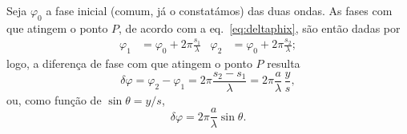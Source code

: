 Seja $\varphi_0$ a fase inicial (comum, já o constatámos) das duas ondas. As
fases com que atingem o ponto $P$, de acordo com a eq.~\eqref{eq:deltaphix}, são
então dadas por 
\begin{align*}
\varphi_1 &= \varphi_0+2\pi\frac{s_1}{\lambda}&
\varphi_2 &= \varphi_0+2\pi\frac{s_2}{\lambda};
\end{align*}
logo, a diferença de fase com que atingem o ponto $P$ resulta
\begin{equation}\label{eq:youngdf1}
\delta\varphi = \varphi_2-\varphi_1 =2\pi\frac{s_2-s_1}{\lambda}=
2\pi\frac{a}{\lambda}\,\frac{y}{s},
\end{equation}
ou, como função de $\sin\theta=y/s$,
\begin{equation}\label{eq:youngdf2}
\delta\varphi = 2\pi\frac{a}{\lambda}\sin\theta.
\end{equation}

